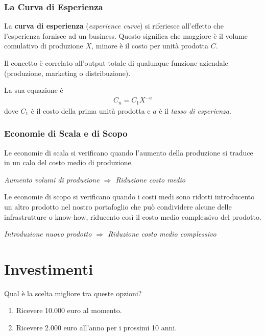 \documentclass[a4paper,portrait,12pt]{article}
\theoremstyle{definition}
\begin{document}
\subsubsection{La Curva di Esperienza}
La \textbf{curva di esperienza} (\emph{experience curve}) si riferiesce all'effetto che l'esperienza fornisce ad un business.
Questo significa che maggiore è il volume comulativo di produzione $X$, minore è il costo per unità prodotta $C$.

Il concetto è correlato all'output totale di qualunque funzione aziendale (produzione, marketing o distribuzione).

La sua equazione è
\begin{align*}
C_n = C_1 X^{-a}
\end{align*}
dove $C_1$ è il costo della prima unità prodotta e $a$ è il \emph{tasso di esperienza}.


\subsubsection{Economie di Scala e di Scopo}
Le economie di scala si verificano quando l'aumento della produzione si traduce in un calo del costo medio di produzione.
\begin{center}
\emph{Aumento volumi di produzione $\Rightarrow$ Riduzione costo medio}
\end{center}

Le economie di scopo si verificano quando i costi medi sono ridotti introducento un altro prodotto nel nostro portafoglio che può condividere alcune delle infrastrutture o know-how, riducento così il costo medio complessivo del prodotto.
\begin{center}
\emph{Introduzione nuovo prodotto $\Rightarrow$ Riduzione costo medio complessivo}
\end{center}



\newpage
\section{Investimenti}



Qual è la scelta migliore tra queste opzioni?
\begin{enumerate}
\item Ricevere 10.000 euro al momento.
\item Ricevere 2.000 euro all'anno per i prossimi 10 anni.
\end{enumerate}
\end{document}
